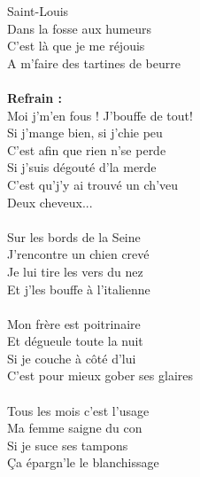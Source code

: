 
 Saint-Louis
\\Dans la fosse aux humeurs
\\C'est là que je me réjouis
\\A m'faire des tartines de beurre
\\\\\textbf{Refrain :}
\\Moi j'm'en fous ! J'bouffe de tout!
\\Si j'mange bien, si j'chie peu
\\C'est afin que rien n'se perde
\\Si j'suis dégouté d'la merde
\\C'est qu'j'y ai trouvé un ch'veu
\\Deux cheveux...
\\\\Sur les bords de la Seine
\\J'rencontre un chien crevé
\\Je lui tire les vers du nez
\\Et j'les bouffe à l'italienne
\\\\Mon frère est poitrinaire
\\Et dégueule toute la nuit
\\Si je couche à côté d'lui
\\C'est pour mieux gober ses glaires
\\\\Tous les mois c'est l'usage
\\Ma femme saigne du con
\\Si je suce ses tampons
\\Ça épargn'le le blanchissage
\breakpage
